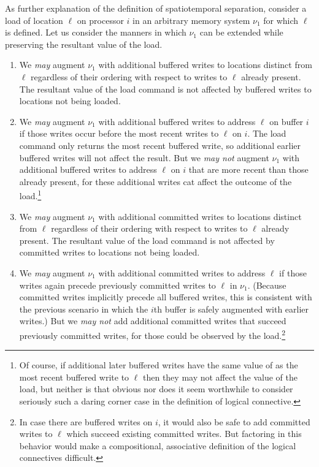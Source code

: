\documentclass[11pt]{report}         %
\begin{document}
As further explanation of the definition of spatiotemporal separation, consider a load of location $\ell$ on processor $i$ in an arbitrary memory system $\nu_1$ for which $\ell$ is defined. Let us consider the manners in which $\nu_1$ can be extended while preserving the resultant value of the load. \begin{enumerate}

  \item We \emph{may} augment $\nu_1$ with additional buffered writes to locations distinct from $\ell$ regardless of their ordering with respect to writes to $\ell$ already present. The resultant value of the load command is not affected by buffered writes to locations not being loaded. 

  \item We \emph{may} augment $\nu_1$ with additional buffered writes to address $\ell$ on buffer $i$ if those writes occur before the most recent writes to $\ell$ on $i$. The load command only returns the most recent buffered write, so additional earlier buffered writes will not affect the result. But we \emph{may not} augment $\nu_1$ with additional buffered writes to address $\ell$ on $i$ that are more recent than those already present, for these additional writes cat affect the outcome of the load.\footnote{Of course, if additional later buffered writes have the same value of as the most recent buffered write to $\ell$ then they may not affect the value of the load, but neither is that obvious nor does it seem worthwhile to consider seriously such a daring corner case in the definition of logical connective.} 
  
  \item We \emph{may} augment $\nu_1$ with additional committed writes to locations distinct from $\ell$ regardless of their ordering with respect to writes to $\ell$ already present. The resultant value of the load command is not affected by committed writes to locations not being loaded.  
  \item We \emph{may} augment $\nu_1$ with additional committed writes to address $\ell$ if those writes again precede previously committed writes to $\ell$ in $\nu_1$. (Because committed writes implicitly precede all buffered writes, this is consistent with the previous scenario in which the $i$th buffer is safely augmented with earlier writes.) But we \emph{may not} add additional committed writes that succeed previously committed writes, for those could be observed by the load.\footnote{In case there are buffered writes on $i$, it would also be safe to add committed writes to $\ell$ which succeed existing committed writes. But factoring in this behavior would make a compositional, associative definition of the logical connectives difficult.} 
    

\end{enumerate}
\end{document}
